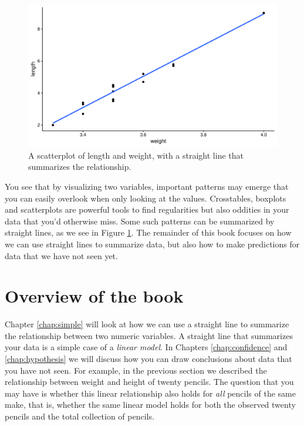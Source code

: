 \documentclass[]{book}\usepackage[]{graphicx}\usepackage[]{color}
\makeatletter
\def\maxwidth{ %
  \ifdim\Gin@nat@width>\linewidth
    \linewidth
  \else
    \Gin@nat@width
  \fi
}
\makeatother
\begin{document}
\begin{figure}

{\centering \includegraphics[width=\maxwidth]{figure/line_1-1} 

}

\caption[A scatterplot of length and weight, with a straight line that summarizes the relationship]{A scatterplot of length and weight, with a straight line that summarizes the relationship.}\label{fig:line_1}
\end{figure}



You see that by visualizing two variables, important patterns may emerge that you can easily overlook when only looking at the values. Crosstables, boxplots and scatterplots are powerful tools to find regularities but also oddities in your data that you'd otherwise miss. Some such patterns can be summarized by straight lines, as we see in Figure \ref{fig:line_1}. The remainder of this book focuses on how we can use straight lines to summarize data, but also how to make predictions for data that we have not seen yet.


\section{Overview of the book}

Chapter \ref{chap:simple} will look at how we can use a straight line to summarize the relationship between two numeric variables. A straight line that summarizes your data is a simple case of a \textit{linear model}. In Chapters \ref{chap:confidence} and \ref{chap:hypothesis} we will discuss how you can draw conclusions about data that you have not seen. For example, in the previous section we described the relationship between weight and height of twenty pencils. The question that you may have is whether this linear relationship also holds for \textit{all} pencils of the same make, that is, whether the same linear model holds for both the observed twenty pencils and the total collection of pencils.
\end{document}
